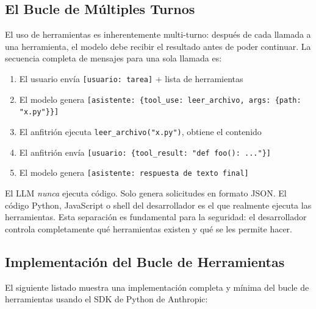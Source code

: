 \documentclass[11pt,letterpaper]{article}
\begin{document}
\subsection{El Bucle de Múltiples Turnos}

El uso de herramientas es inherentemente multi-turno: después de cada llamada a una herramienta, el modelo debe recibir el resultado antes de poder continuar. La secuencia completa de mensajes para una sola llamada es:

\begin{enumerate}[leftmargin=*]
    \item El usuario envía \texttt{[usuario: tarea]} + lista de herramientas
    \item El modelo genera \texttt{[asistente: \{tool\_use: leer\_archivo, args: \{path: "x.py"\}\}]}
    \item El anfitrión ejecuta \texttt{leer\_archivo("x.py")}, obtiene el contenido
    \item El anfitrión envía \texttt{[usuario: \{tool\_result: "def foo(): ..."\}]}
    \item El modelo genera \texttt{[asistente: respuesta de texto final]}
\end{enumerate}

\begin{notebox}
El LLM \emph{nunca} ejecuta código. Solo genera solicitudes en formato JSON. El código Python, JavaScript o shell del desarrollador es el que realmente ejecuta las herramientas. Esta separación es fundamental para la seguridad: el desarrollador controla completamente qué herramientas existen y qué se les permite hacer.
\end{notebox}

\subsection{Implementación del Bucle de Herramientas}

El siguiente listado muestra una implementación completa y mínima del bucle de herramientas usando el SDK de Python de Anthropic:
\end{document}
